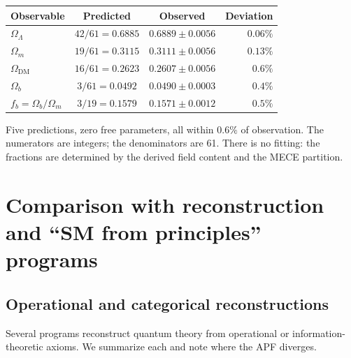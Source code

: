 \documentclass[11pt,a4paper]{article}
\theoremstyle{definition}
\begin{document}
\smallskip
\begin{center}
\small
\begin{tabular}{@{}lccr@{}}
\toprule
\textbf{Observable} & \textbf{Predicted} & \textbf{Observed} & \textbf{Deviation} \\
\midrule
$\Omega_\Lambda$ & $42/61 = 0.6885$ & $0.6889 \pm 0.0056$ & $0.06\%$ \\
$\Omega_m$ & $19/61 = 0.3115$ & $0.3111 \pm 0.0056$ & $0.13\%$ \\
$\Omega_{\mathrm{DM}}$ & $16/61 = 0.2623$ & $0.2607 \pm 0.0056$ & $0.6\%$ \\
$\Omega_b$ & $3/61 = 0.0492$ & $0.0490 \pm 0.0003$ & $0.4\%$ \\
$f_b = \Omega_b/\Omega_m$ & $3/19 = 0.1579$ & $0.1571 \pm 0.0012$ & $0.5\%$ \\
\bottomrule
\end{tabular}
\end{center}

\smallskip\noindent Five predictions, zero free parameters, all within
$0.6\%$ of observation.  The numerators are integers; the denominators
are 61.  There is no fitting: the fractions are determined by the
derived field content and the MECE partition.


\newpage


\appendix


\section{Comparison with reconstruction and ``SM from principles'' programs}
\label{app:literature}


\subsection{Operational and categorical reconstructions}
\label{sec:op_reconstructions}

Several programs reconstruct quantum theory from operational or
information-theoretic axioms.  We summarize each and note where the
APF diverges.
\end{document}
